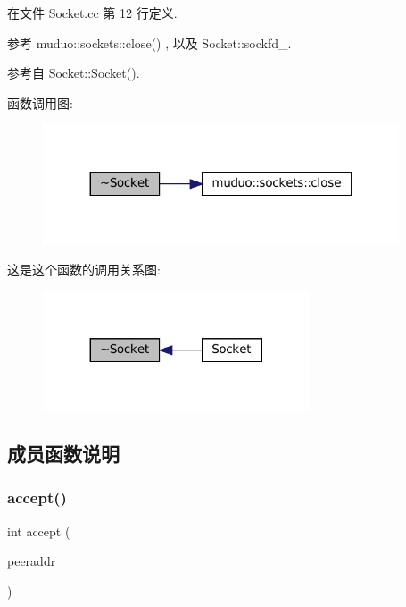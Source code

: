 在文件 Socket.\+cc 第 12 行定义.



参考 muduo\+::sockets\+::close() , 以及 Socket\+::sockfd\+\_\+.



参考自 Socket\+::\+Socket().

函数调用图\+:
\nopagebreak
\begin{figure}[H]
\begin{center}
\leavevmode
\includegraphics[width=299pt]{classmuduo_1_1Socket_af387aca495ea9a25c511cd7d02d997bb_cgraph}
\end{center}
\end{figure}
这是这个函数的调用关系图\+:
\nopagebreak
\begin{figure}[H]
\begin{center}
\leavevmode
\includegraphics[width=224pt]{classmuduo_1_1Socket_af387aca495ea9a25c511cd7d02d997bb_icgraph}
\end{center}
\end{figure}


\subsection{成员函数说明}
\mbox{\label{classmuduo_1_1Socket_a4f91f07f92cd51f6d6d4214af1e9b73f}} 
\subsubsection{\texorpdfstring{accept()}{accept()}}
{\footnotesize\ttfamily int accept (\begin{DoxyParamCaption}\item[{\hyperlink{classmuduo_1_1InetAddress}{Inet\+Address} $\ast$}]{peeraddr }\end{DoxyParamCaption})}

